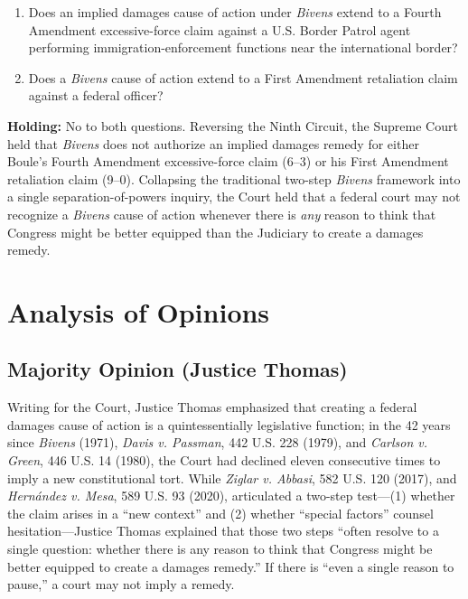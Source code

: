 \documentclass[12pt]{article}
\begin{document}
\begin{enumerate}
  \item Does an implied damages cause of action under \textit{Bivens} extend to a Fourth Amendment excessive-force claim against a U.S. Border Patrol agent performing immigration-enforcement functions near the international border?
  \item Does a \textit{Bivens} cause of action extend to a First Amendment retaliation claim against a federal officer?
\end{enumerate}

\textbf{Holding:} No to both questions. Reversing the Ninth Circuit, the Supreme Court held that \textit{Bivens} does not authorize an implied damages remedy for either Boule's Fourth Amendment excessive-force claim (6--3) or his First Amendment retaliation claim (9--0). Collapsing the traditional two-step \textit{Bivens} framework into a single separation-of-powers inquiry, the Court held that a federal court may not recognize a \textit{Bivens} cause of action whenever there is \textit{any} reason to think that Congress might be better equipped than the Judiciary to create a damages remedy.

\section{Analysis of Opinions}
\subsection{Majority Opinion (Justice Thomas)}

Writing for the Court, Justice Thomas emphasized that creating a federal damages cause of action is a quintessentially legislative function; in the 42 years since \textit{Bivens} (1971), \textit{Davis v. Passman}, 442 U.S. 228 (1979), and \textit{Carlson v. Green}, 446 U.S. 14 (1980), the Court had declined eleven consecutive times to imply a new constitutional tort. While \textit{Ziglar v. Abbasi}, 582 U.S. 120 (2017), and \textit{Hern\'andez v. Mesa}, 589 U.S. 93 (2020), articulated a two-step test---(1) whether the claim arises in a ``new context'' and (2) whether ``special factors'' counsel hesitation---Justice Thomas explained that those two steps ``often resolve to a single question: whether there is any reason to think that Congress might be better equipped to create a damages remedy.'' If there is ``even a single reason to pause,'' a court may not imply a remedy.
\end{document}
